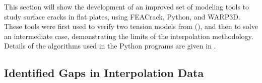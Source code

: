 \begin{frame}
\end{frame}

This section will show the development of an improved set of modeling tools to study surface cracks in flat plates, using FEACrack, Python, and WARP3D.
These tools were first used to verify two tension models from \citeauthor{allenwells2014} (\citeyear{allenwells2014}), and then to solve an intermediate case, demonstrating the limits of the interpolation methodology.
Details of the algorithms used in the Python programs are given in .

\subsection{Identified Gaps in Interpolation Data}

